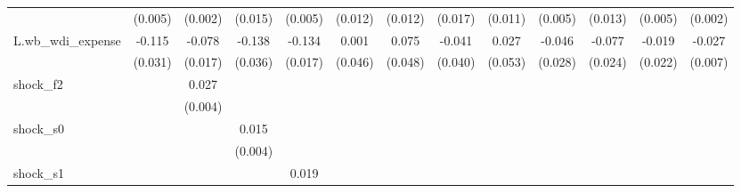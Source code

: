 {\begin{tabular}{l*{12}{c}}
            &     (0.005)         &     (0.002)         &     (0.015)         &     (0.005)         &     (0.012)         &     (0.012)         &     (0.017)         &     (0.011)         &     (0.005)         &     (0.013)         &     (0.005)         &     (0.002)         \\
\addlinespace
L.wb\_wdi\_expense&      -0.115\sym{***}&      -0.078\sym{***}&      -0.138\sym{***}&      -0.134\sym{***}&       0.001         &       0.075         &      -0.041         &       0.027         &      -0.046         &      -0.077\sym{***}&      -0.019         &      -0.027\sym{***}\\
            &     (0.031)         &     (0.017)         &     (0.036)         &     (0.017)         &     (0.046)         &     (0.048)         &     (0.040)         &     (0.053)         &     (0.028)         &     (0.024)         &     (0.022)         &     (0.007)         \\
\addlinespace
shock\_f2    &                     &       0.027\sym{***}&                     &                     &                     &                     &                     &                     &                     &                     &                     &                     \\
            &                     &     (0.004)         &                     &                     &                     &                     &                     &                     &                     &                     &                     &                     \\
\addlinespace
shock\_s0    &                     &                     &       0.015\sym{***}&                     &                     &                     &                     &                     &                     &                     &                     &                     \\
            &                     &                     &     (0.004)         &                     &                     &                     &                     &                     &                     &                     &                     &                     \\
\addlinespace
shock\_s1    &                     &                     &                     &       0.019\sym{***}&                     &                     &                     &                     &                     &                     &                     &                     \\

\end{tabular}}
